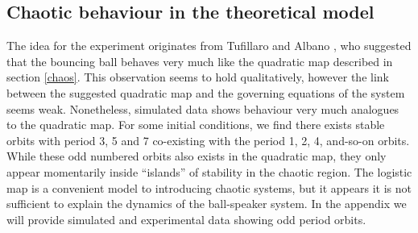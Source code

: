 \documentclass[12pt,oneside,a4paper]{article}
\numberwithin{equation}{section}
\begin{document}
{{{{\subsection{Chaotic behaviour in the theoretical model}
The idea for the experiment originates from Tufillaro and Albano \cite{tufillaro}, who suggested that the bouncing ball behaves very much like the quadratic map described in section \ref{chaos}. This observation seems to hold qualitatively, however the link between the suggested quadratic map and the governing equations of the system seems weak. Nonetheless, simulated data shows behaviour very much analogues to the quadratic map. For some initial conditions, we find there exists stable orbits with period 3, 5 and 7 co-existing with the period 1, 2, 4, and-so-on orbits. While these odd numbered orbits also exists in the quadratic map, they only appear momentarily inside ``islands'' of stability in the chaotic region. The logistic map is a convenient model to introducing chaotic systems, but it appears it is not sufficient to explain the dynamics of the ball-speaker system. In the appendix we will provide simulated and experimental data showing odd period orbits.

}}}}
\end{document}
